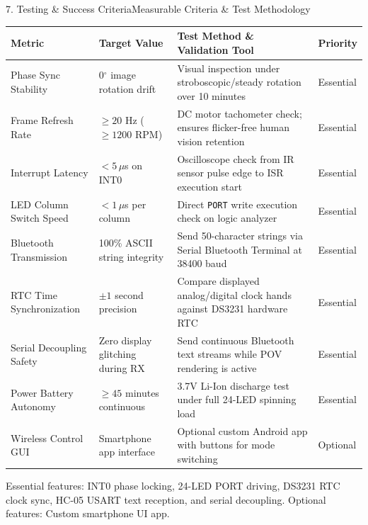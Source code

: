 \documentclass[aspectratio=169, 10pt]{beamer}
\begin{document}
\begin{frame}{7. Testing \& Success Criteria}{Measurable Criteria \& Test Methodology}
    \tiny
    \renewcommand{\arraystretch}{0.88}
    \begin{table}
        \centering
        \begin{tabular}{p{2.5cm} p{2.5cm} p{5.5cm} p{1.1cm}}
            \toprule
            \textbf{\color{Accent} Metric} & \textbf{\color{Accent} Target Value} & \textbf{\color{Accent} Test Method \& Validation Tool} & \textbf{\color{Accent} Priority} \\
            \midrule
            Phase Sync Stability & 0$^\circ$ image rotation drift & Visual inspection under stroboscopic/steady rotation over 10 minutes & Essential \\
            Frame Refresh Rate & $\ge 20$ Hz ($\ge 1200$ RPM) & DC motor tachometer check; ensures flicker-free human vision retention & Essential \\
            Interrupt Latency & $< 5\,\mu$s on INT0 & Oscilloscope check from IR sensor pulse edge to ISR execution start & Essential \\
            LED Column Switch Speed & $< 1\,\mu$s per column & Direct \texttt{PORT} write execution check on logic analyzer & Essential \\
            Bluetooth Transmission & 100\% ASCII string integrity & Send 50-character strings via Serial Bluetooth Terminal at 38400 baud & Essential \\
            RTC Time Synchronization & $\pm 1$ second precision & Compare displayed analog/digital clock hands against DS3231 hardware RTC & Essential \\
            Serial Decoupling Safety & Zero display glitching during RX & Send continuous Bluetooth text streams while POV rendering is active & Essential \\
            Power Battery Autonomy & $\ge 45$ minutes continuous & 3.7V Li-Ion discharge test under full 24-LED spinning load & Essential \\
            Wireless Control GUI & Smartphone app interface & Optional custom Android app with buttons for mode switching & Optional \\
            \bottomrule
        \end{tabular}
    \end{table}
    \vspace{0.15cm}
    \footnotesize\color{Dim} Essential features: INT0 phase locking, 24-LED PORT driving, DS3231 RTC clock sync, HC-05 USART text reception, and serial decoupling. Optional features: Custom smartphone UI app.
\end{frame}
\end{document}

